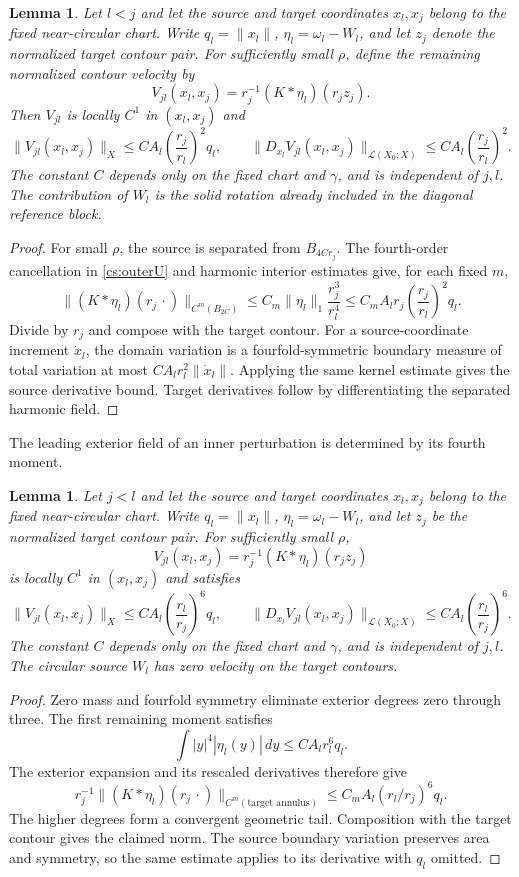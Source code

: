 \documentclass[11pt]{amsart}
\newtheorem{lemma}[theorem]{Lemma}
\theoremstyle{remark}
\numberwithin{equation}{section}
\begin{document}
\begin{lemma}
\label{ib:out}
Let $l<j$ and let the source and target coordinates $x_l,x_j$
belong to the fixed near-circular chart. Write
$q_l=\|x_l\|$, $\eta_l=\omega_l-W_l$, and let $z_j$ denote the
normalized target contour pair. For sufficiently small $\rho$,
define the remaining normalized contour velocity by
\[
 V_{jl}(x_l,x_j)=r_j^{-1}(K*\eta_l)(r_jz_j).
\]
Then $V_{jl}$ is locally $C^1$ in $(x_l,x_j)$ and
\[
 \|V_{jl}(x_l,x_j)\|_X
       \le CA_l\left(\frac{r_j}{r_l}\right)^2q_l,\qquad
 \|D_{x_l}V_{jl}(x_l,x_j)\|_{\mathcal L(X_0;X)}
       \le CA_l\left(\frac{r_j}{r_l}\right)^2.
\]
The constant $C$ depends only on the fixed chart and $\gamma$,
and is independent of $j,l$. The contribution of $W_l$ is the
solid rotation already included in the diagonal reference block.
\end{lemma}
\begin{proof}
For small $\rho$, the source is separated from $B_{4Cr_j}$.
The fourth-order cancellation in \eqref{cs:outerU} and harmonic
interior estimates give, for each fixed $m$,
\[
 \|(K*\eta_l)(r_j\,\cdot)\|_{C^m(B_{2C})}
 \le C_m\|\eta_l\|_1\frac{r_j^3}{r_l^4}
 \le C_mA_lr_j\left(\frac{r_j}{r_l}\right)^2q_l.
\]
Divide by $r_j$ and compose with the target contour.
For a source-coordinate increment $\dot x_l$, the domain
variation is a fourfold-symmetric boundary measure of total
variation at most $CA_lr_l^2\|\dot x_l\|$. Applying the same
kernel estimate gives the source derivative bound. Target
derivatives follow by differentiating the separated harmonic field.
\end{proof}

The leading exterior field of an inner perturbation is determined by its fourth moment.

\begin{lemma}
\label{ib:in}
Let $j<l$ and let the source and target coordinates $x_l,x_j$
belong to the fixed near-circular chart. Write
$q_l=\|x_l\|$, $\eta_l=\omega_l-W_l$, and let $z_j$ be the
normalized target contour pair. For sufficiently small $\rho$,
\[
 V_{jl}(x_l,x_j)=r_j^{-1}(K*\eta_l)(r_jz_j)
\]
is locally $C^1$ in $(x_l,x_j)$ and satisfies
\[
 \|V_{jl}(x_l,x_j)\|_X
       \le CA_l\left(\frac{r_l}{r_j}\right)^6q_l,\qquad
 \|D_{x_l}V_{jl}(x_l,x_j)\|_{\mathcal L(X_0;X)}
       \le CA_l\left(\frac{r_l}{r_j}\right)^6.
\]
The constant $C$ depends only on the fixed chart and $\gamma$,
and is independent of $j,l$. The circular source $W_l$ has zero
velocity on the target contours.
\end{lemma}
\begin{proof}
Zero mass and fourfold symmetry eliminate exterior degrees zero
through three. The first remaining moment satisfies
\[
 \int|y|^4|\eta_l(y)|\,dy\le CA_lr_l^6q_l.
\]
The exterior expansion and its rescaled derivatives therefore give
\[
 r_j^{-1}\|(K*\eta_l)(r_j\,\cdot)\|_{C^m(\text{target annulus})}
       \le C_mA_l(r_l/r_j)^6q_l.
\]
The higher degrees form a convergent geometric tail. Composition
with the target contour gives the claimed norm. The source
boundary variation preserves area and symmetry, so the same
estimate applies to its derivative with $q_l$ omitted.
\end{proof}
\end{document}
